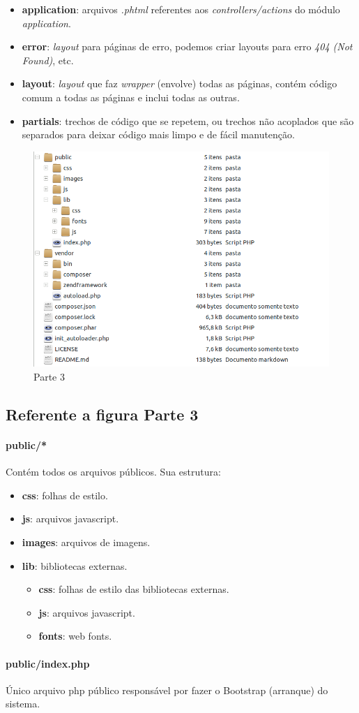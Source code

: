 \begin{itemize}
\item
  \textbf{application}: arquivos \emph{.phtml} referentes aos
  \emph{controllers/actions} do módulo \emph{application}.
\item
  \textbf{error}: \emph{layout} para páginas de erro, podemos criar
  layouts para erro \emph{404 (Not Found)}, etc.
\item
  \textbf{layout}: \emph{layout} que faz \emph{wrapper} (envolve) todas
  as páginas, contém código comum a todas as páginas e inclui todas as
  outras.
\item
  \textbf{partials}: trechos de código que se repetem, ou trechos não
  acoplados que são separados para deixar código mais limpo e de fácil
  manutenção.
\end{itemize}
\begin{figure}
    \includegraphics[scale=0.5]{img/arquitetura-pacotes-03.png}
    \caption{Parte 3}
\end{figure}

\subsection{Referente a figura Parte 3}

\paragraph{public/*}

Contém todos os arquivos públicos. Sua estrutura:

\begin{itemize}
\item
  \textbf{css}: folhas de estilo.
\item
  \textbf{js}: arquivos javascript.
\item
  \textbf{images}: arquivos de imagens.
\item
  \textbf{lib}: bibliotecas externas.
  \begin{itemize}
  \item
    \textbf{css}: folhas de estilo das bibliotecas externas.
  \item
    \textbf{js}: arquivos javascript.
  \item
    \textbf{fonts}: web fonts.
  \end{itemize}
\end{itemize}
\paragraph{public/index.php}

Único arquivo php público responsável por fazer o Bootstrap (arranque)
do sistema.
